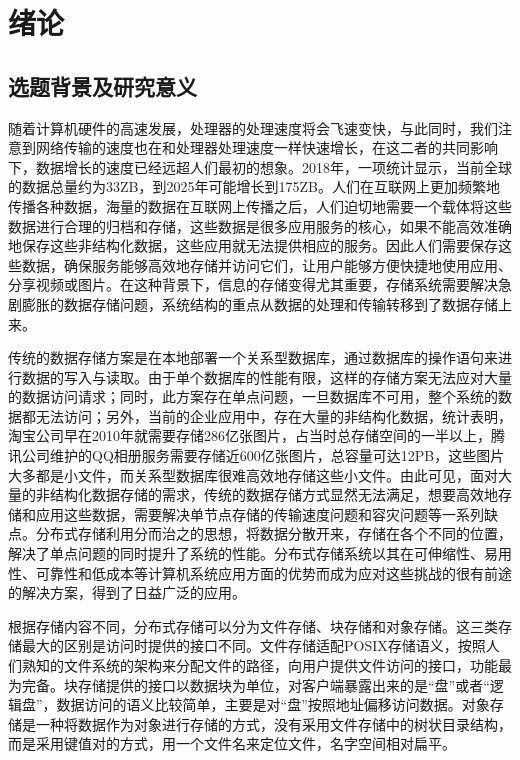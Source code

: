 
\chapter{绪论}

\section{选题背景及研究意义}%
随着计算机硬件的高速发展，处理器的处理速度将会飞速变快，与此同时，我们注意到网络传输的速度也在和处理器处理速度一样快速增长，在这二者的共同影响下，数据增长的速度已经远超人们最初的想象。2018年，一项统计显示，当前全球的数据总量约为33ZB，到2025年可能增长到175ZB\cite{1}。人们在互联网上更加频繁地传播各种数据，海量的数据在互联网上传播之后，人们迫切地需要一个载体将这些数据进行合理的归档和存储，这些数据是很多应用服务的核心，如果不能高效准确地保存这些非结构化数据，这些应用就无法提供相应的服务\cite{2}。因此人们需要保存这些数据，确保服务能够高效地存储并访问它们，让用户能够方便快捷地使用应用、分享视频或图片。在这种背景下，信息的存储变得尤其重要，存储系统需要解决急剧膨胀的数据存储问题，系统结构的重点从数据的处理和传输转移到了数据存储上来。

传统的数据存储方案是在本地部署一个关系型数据库，通过数据库的操作语句来进行数据的写入与读取。由于单个数据库的性能有限，这样的存储方案无法应对大量的数据访问请求；同时，此方案存在单点问题，一旦数据库不可用，整个系统的数据都无法访问；另外，当前的企业应用中，存在大量的非结构化数据，统计表明，淘宝公司早在2010年就需要存储286亿张图片\cite{3}，占当时总存储空间的一半以上，腾讯公司维护的QQ相册服务需要存储近600亿张图片，总容量可达12PB\cite{4}，这些图片大多都是小文件，而关系型数据库很难高效地存储这些小文件。由此可见，面对大量的非结构化数据存储的需求，传统的数据存储方式显然无法满足，想要高效地存储和应用这些数据，需要解决单节点存储的传输速度问题和容灾问题等一系列缺点\cite{5}。分布式存储利用分而治之的思想，将数据分散开来，存储在各个不同的位置，解决了单点问题的同时提升了系统的性能。分布式存储系统以其在可伸缩性、易用性、可靠性和低成本等计算机系统应用方面的优势而成为应对这些挑战的很有前途的解决方案，得到了日益广泛的应用\cite{6}。

根据存储内容不同，分布式存储可以分为文件存储、块存储和对象存储。这三类存储最大的区别是访问时提供的接口不同。文件存储适配POSIX存储语义，按照人们熟知的文件系统的架构来分配文件的路径，向用户提供文件访问的接口，功能最为完备。块存储提供的接口以数据块为单位，对客户端暴露出来的是“盘”或者“逻辑盘”，数据访问的语义比较简单，主要是对“盘”按照地址偏移访问数据。对象存储是一种将数据作为对象进行存储的方式，没有采用文件存储中的树状目录结构，而是采用键值对的方式，用一个文件名来定位文件，名字空间相对扁平。


